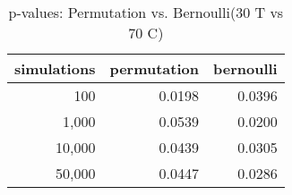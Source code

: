 \begin{table}[h]

\centering
\begin{tabular}[t]{rrr}
\toprule
simulations & permutation & bernoulli\\
\midrule
100 & 0.0198 & 0.0396\\
1,000 & 0.0539 & 0.0200\\
10,000 & 0.0439 & 0.0305\\
50,000 & 0.0447 & 0.0286\\
\bottomrule
\end{tabular}
\caption{\label{tab:tab:2asimulations(imbalanced)}p-values: Permutation vs. Bernoulli(30 T vs 70 C)}
\label{tab:2asimulations(imbalanced)}
\end{table}
